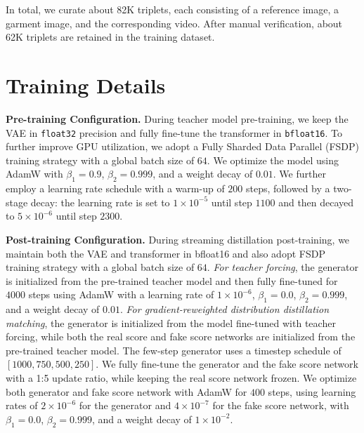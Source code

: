 \documentclass{llmxive}
\begin{document}
In total, we curate about 82K triplets, each consisting of a reference image, a garment image, and the corresponding video. After manual verification, about 62K triplets are retained in the training dataset.



\section{Training Details}
%
\noindent
\textbf{Pre-training Configuration.}
% 
During teacher model pre-training, we keep the VAE in \texttt{float32} precision and fully fine-tune the transformer in \texttt{bfloat16}. 
To further improve GPU utilization, we adopt a Fully Sharded Data Parallel (FSDP) training strategy with a global batch size of $64$.
We optimize the model using AdamW with $\beta_1=0.9$, $\beta_2=0.999$, and a weight decay of $0.01$. 
We further employ a learning rate schedule with a warm-up of $200$ steps, followed by a two-stage decay: the learning rate is set to $1\times10^{-5}$ until step $1100$ and then decayed to $5\times10^{-6}$ until step $2300$.
%



\noindent
\textbf{Post-training Configuration.}
% 
During streaming distillation post-training, we maintain both the VAE and transformer in bfloat16 and also adopt FSDP training strategy with a global batch size of $64$.
% 
\textit{For teacher forcing}, the generator is initialized from the pre-trained teacher model and then fully fine-tuned for $4000$ steps using AdamW with a learning rate of $1\times10^{-6}$, $\beta_1=0.0$, $\beta_2=0.999$, and a weight decay of $0.01$.
% 
\textit{For gradient-reweighted distribution distillation matching}, the generator is initialized from the model fine-tuned with teacher forcing, while both the real score and fake score networks are initialized from the pre-trained teacher model. The few-step generator uses a timestep schedule of $[1000, 750, 500, 250]$. 
We fully fine-tune the generator and the fake score network with a 1:5 update ratio, while keeping the real score network frozen.
We optimize both generator and fake score network with AdamW for $400$ steps, using learning rates of $2\times10^{-6}$ for the generator and $4\times10^{-7}$ for the fake score network, with $\beta_1=0.0$, $\beta_2=0.999$, and a weight decay of $1\times10^{-2}$.
\end{document}
